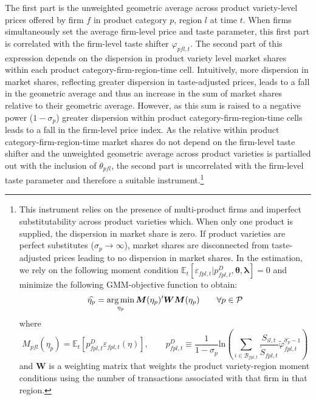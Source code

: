 \noindent The first part is the unweighted geometric average across product variety-level prices offered by firm $f$ in product category $p$, region $l$ at time $t$. When firms simultaneously set the average firm-level price and taste parameter, this first part is correlated with the firm-level taste shifter $\varphi_{pfl,t}$. The second part of this expression depends on the dispersion in product variety level market shares within each product category-firm-region-time cell. Intuitively, more dispersion in market shares, reflecting greater dispersion in taste-adjusted prices, leads to a fall in the geometric average and thus an increase in the sum of market shares relative to their geometric average. However, as this sum is raised to a negative power ($1-\sigma_p$) greater dispersion within product category-firm-region-time cells leads to a fall in the firm-level price index. As the relative within product category-firm-region-time market shares do not depend on the firm-level taste shifter and the unweighted geometric average across product varieties is partialled out with the inclusion of $\theta_{pfl}$, the second part is uncorrelated with the firm-level taste parameter and therefore a suitable instrument.\footnote{This instrument relies on the presence of multi-product firms and imperfect substitutability across product varieties which. When only one product is supplied, the dispersion in market share is zero. If product varieties are perfect substitutes ($\sigma_p \rightarrow \infty$), market shares are disconnected from taste-adjusted prices leading to no dispersion in market shares. In the estimation, we rely on the following moment condition $\mathbb{E}_{t}\left[{\varepsilon_{fpl,t}|p^{D}_{fpl,t},\boldsymbol{\theta},\boldsymbol{\lambda}}\right] = 0$ and minimize the following GMM-objective function to obtain: 
\begin{equation*}
    \widehat{\eta_p} = \operatorname*{arg\,min}_{\eta_p} \boldsymbol{M}(\eta_p)'\boldsymbol{W}\boldsymbol{M}(\eta_p) \qquad \forall p \in \mathcal{P} 
\end{equation*}
where 
\begin{equation*}
    M_{pfl}(\eta_p) = \mathbb{E}_{t}\left[p^{D}_{fpl,t}\varepsilon_{fpl,t}(\eta)\right], \qquad 
    p^{D}_{fpl,t} \equiv 
        \frac{1}{1-\hat{\sigma}_p}
        \text{ln}\left(\sum_{i \in \mathcal{B}_{fpl,t}}\frac{S_{il,t}}{\tilde{S}_{fpl,t}} \tilde{\varphi}_{fpl,t}^{\hat{\sigma_p}-1}\right)
\end{equation*}
and $\boldsymbol{W}$ is a weighting matrix that weights the product variety-region moment conditions using the number of transactions associated with that firm in that region.}

